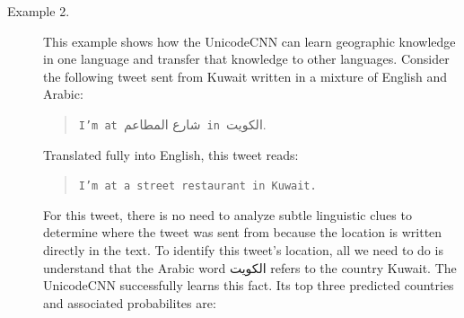 \documentclass[sigconf,anonymous,review]{acmart}
\newcommand{\str}[1]{\texttt{#1}}
\begin{document}
\begin{description}
\item[Example 2.]
    This example shows how the UnicodeCNN can learn geographic knowledge in one language and transfer that knowledge to other languages.
Consider the following tweet sent from Kuwait written in a mixture of English and Arabic:
\begin{quote}
\str{I'm at }\foreignlanguage{arabic}{شارع المطاعم}\str{ in }\foreignlanguage{arabic}{الكويت}.%
\end{quote}
Translated fully into English, this tweet reads:
\begin{quote}
    \str{I'm at a street restaurant in Kuwait.}
\end{quote}
For this tweet, there is no need to analyze subtle linguistic clues to determine where the tweet was sent from because the location is written directly in the text.
To identify this tweet's location, all we need to do is understand that the Arabic word 
\foreignlanguage{arabic}{الكويت}
refers to the country Kuwait.
The UnicodeCNN successfully learns this fact. 
Its top three predicted countries and associated probabilites are:

\noindent



\end{description}
\end{document}

